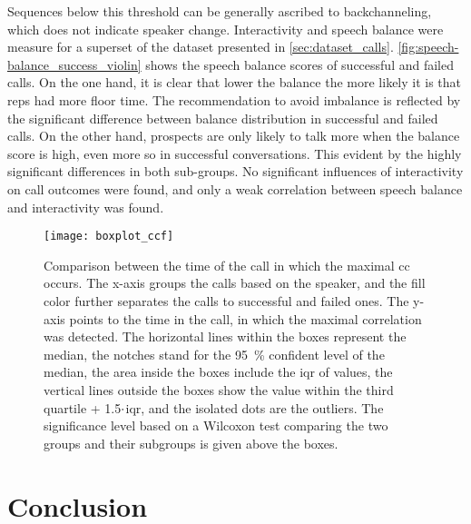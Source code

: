 Sequences below this threshold can be generally ascribed to backchanneling, which does not indicate speaker change.
Interactivity and speech balance were measure for a superset of the dataset presented in \cref{sec:dataset_calls}.
\cref{fig:speech-balance_success_violin} shows the speech balance scores of successful and failed calls.
On the one hand, it is clear that lower the balance the more likely it is that reps had more floor time.
The recommendation to avoid imbalance is reflected by the significant difference between balance distribution in successful and failed calls.
On the other hand, prospects are only likely to talk more when the balance score is high, even more so in successful conversations.
This evident by the highly significant differences in both sub-groups.
No significant influences of interactivity on call outcomes were found, and only a weak correlation between speech balance and interactivity was found. %
%
\begin{figure}[H]
	\centering
	\texttt{[image: boxplot\_ccf]}
	\caption[Comparison between sales reps' and prospects' maximal \acl{cc} point in conversation for successful and failed calls.]
		{Comparison between the time of the call in which the maximal \acl{cc} occurs.
		The x-axis groups the calls based on the speaker, and the fill color further separates the calls to successful and failed ones.
		The y-axis points to the time in the call, in which the maximal correlation was detected.
		The horizontal lines within the boxes represent the median,
		the notches stand for the \SI{95}{\percent} confident level of the median, the area inside the boxes include the \acf{iqr} of values, the vertical lines outside the boxes show the value within the third quartile + 1.5$\protect\cdot$\ac{iqr}, and the isolated dots are the outliers.
		The significance level based on a Wilcoxon test comparing the two groups and their subgroups is given above the boxes.}
	\label{fig:barplot_conv_leaders}
\end{figure}
%

\section{Conclusion}
\label{sec:conclusion_hhi}

